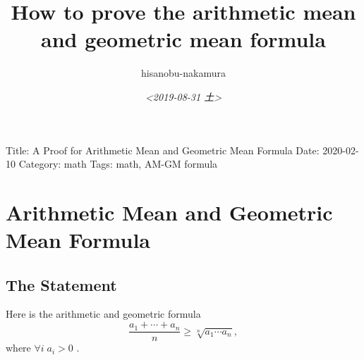 \documentclass{article}
\author{hisanobu-nakamura}
\date{\textit{<2019-08-31 土>}}
\title{How to prove the arithmetic mean and geometric mean formula}
\begin{document}
\maketitle
Title: A Proof for Arithmetic Mean and Geometric Mean Formula
Date: 2020-02-10
Category: math
Tags: math, AM-GM formula


\section{Arithmetic Mean and Geometric Mean Formula}
\label{sec-1}
\subsection{The Statement}
\label{sec-1-1}
Here is the arithmetic and geometric formula
\begin{equation*}
\label{ }
\frac{a_1 + \cdots + a_n}{n} \ge \sqrt[n]{a_1\cdots a_n},
\end{equation*}
where $\forall i \; a_i > 0$ .
\end{document}

